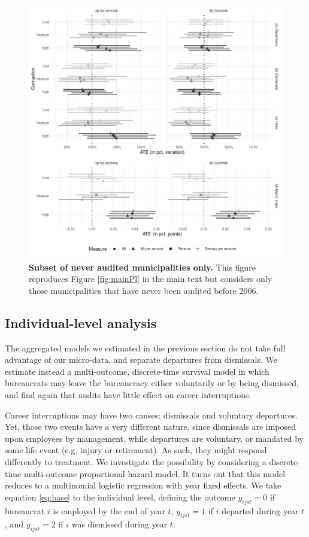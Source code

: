 \documentclass[12pt,a4paper]{article}
\theoremstyle{definition}
\begin{document}
{\begin{figure}[H]
    \centering
    \includegraphics{figures/plSubsetMun}
    \caption{{\bf Subset of never audited municipalities only.} This figure reproduces Figure \ref{fig:mainPl} in the main text but considers only those municipalities that have never been audited before 2006.}
    \label{fig:plSubsetMun}
\end{figure}


\subsection{Individual-level analysis}
\label{app:multinomial}

The aggregated models we estimated in the previous section do not take full advantage of our micro-data, and separate departures from dismissals. We estimate instead a multi-outcome, discrete-time survival model in which bureaucrats may leave the bureaucracy either voluntarily or by being dismissed, and find again that audits have little effect on career interruptions. 

Career interruptions may have two causes: dismissals and voluntary departures. Yet, those two events have a very different nature, since dismissals are imposed upon employees by management, while departures are voluntary, or mandated by some life event (e.g. injury or retirement). As such, they might respond differently to treatment. We investigate the possibility by considering a discrete-time multi-outcome proportional hazard model. It turns out that this model reduces to a multinomial logistic regression with year fixed effects. We take equation \ref{eq:base} to the individual level, defining the outcome $y_{ijst} = 0$ if bureaucrat $i$ is employed by the end of year $t$, $y_{ijst} = 1$ if $i$ departed during year $t$, and $y_{ijst} = 2$ if $i$ was dismissed during year $t$. 

}
\end{document}
